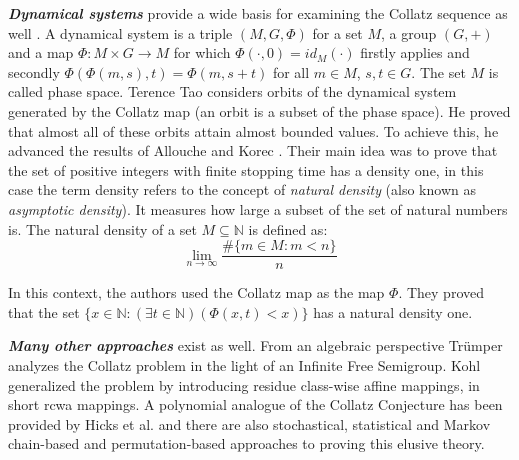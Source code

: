 \par\medskip
\textit{\textbf{Dynamical systems}} provide a wide basis for examining the Collatz sequence as well \cite{Ref_Wirsching_1998}. A dynamical system \cite[p.~464]{Ref_Walz_2017} is a triple $(M,G,\Phi)$ for a set $M$, a group $(G,+)$ and a map $\Phi:M\times G\to M$ for which $\Phi(\cdot,0)=id_M(\cdot)$ firstly applies and secondly $\Phi\left(\Phi(m,s),t\right)=\Phi(m,s+t)$ for all $m\in M$, $s,t\in G$. The set $M$ is called phase space. Terence Tao \cite{Ref_Tao_2019} considers orbits of the dynamical system generated by the Collatz map (an orbit is a subset of the phase space). He proved that almost all of these orbits attain almost bounded values. To achieve this, he advanced the results of Allouche \cite{Ref_Allouche_1978} and Korec \cite{Ref_Korec_1994}. Their main idea was to prove that the set of positive integers with finite stopping time has a density one, in this case the term density refers to the concept of \textit{natural density} (also known as \textit{asymptotic density}). It measures how large a subset of the set of natural numbers is. The natural density of a set $M\subseteq\mathbb{N}$ is defined as:
\[
\lim_{n\to\infty}\frac{\#\{m\in M:m<n\}}{n}
\]

In this context, the authors used the Collatz map as the map $\Phi$. They proved that the set $\{x\in\mathbb{N}:(\exists t\in\mathbb{N})(\Phi(x,t)<x)\}$ has a natural density one.

\par\medskip
\textit{\textbf{Many other approaches}} exist as well. From an algebraic perspective Trümper \cite{Ref_Truemper_2014} analyzes the Collatz problem in the light of an Infinite Free Semigroup. Kohl \cite{Ref_Kohl_2008} generalized the problem by introducing residue class-wise affine mappings, in short rcwa mappings. A polynomial analogue of the Collatz Conjecture has been provided by Hicks et al. \cite{Ref_Hicks_Mullen_Yucas_Zavislak_2008} \cite{Ref_Snapp_Tracy_2008} and there are also stochastical, statistical and Markov chain-based and permutation-based approaches to proving this elusive theory.
